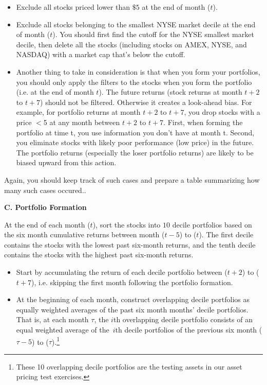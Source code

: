 \begin{enumerate}[1.]
\begin{itemize}
\item Exclude all stocks priced lower than $\$5$ at the end of month ($t$).

\item Exclude all stocks belonging to the smallest NYSE market decile at the
end of month ($t$). You should first find the cutoff for the NYSE smallest
market decile, then delete all the stocks (including stocks on AMEX, NYSE,
and NASDAQ) with a market cap that's below the cutoff.
\item Another thing to take in consideration is that when you form your
portfolios, you should only apply the filters to the stocks when you form the
portfolio (i.e. at the end of month $t$). The future returns (stock returns
at month $t+2$ to $t+7$) should not be filtered. Otherwise it creates a
look-ahead bias. For example, for portfolio returns at month $t+2$ to $t+7$,
you drop stocks with a price $<$5 at any month between $t+2$ to $%
t+7$. First, when forming the portfolio at time t, you use information you
don't have at month t. Second, you eliminate stocks with likely poor
performance (low price) in the future. The portfolio returns (especially the
loser portfolio returns) are likely to be biased upward from this action.
\end{itemize}


Again, you should keep track of such cases and prepare a table
summarizing how many such cases occured..
\hfill
\par\vspace{\baselineskip}
\textbf{C. Portfolio Formation}
\hfill
\par\vspace{\baselineskip}
At the end of each month ($t$), sort the stocks into $10$ decile portfolios
based on the six month cumulative returns between month ($t-5$) to ($t$).
The first decile contains the stocks with the lowest past six-month returns,
and the tenth decile contains the stocks with the highest past six-month
returns.

\begin{itemize}
\item Start by accumulating the return of each decile portfolio between ($%
t+2 $) to ($t+7$), i.e. skipping the first month following the portfolio
formation.

\item At the beginning of each month, construct overlapping decile
portfolios as equally weighted averages of the past six month months' decile
portfolios. That is, at each month $\tau $, the $i$th overlapping decile
portfolio consists of an equal weighted average of the\ $i$th decile
portfolios of the previous six month ($\tau -5$) to ($\tau $).\footnote{%
These 10 overlapping decile portfolios are the testing assets in our asset
pricing test exercises.}


\end{itemize}
\end{enumerate}
